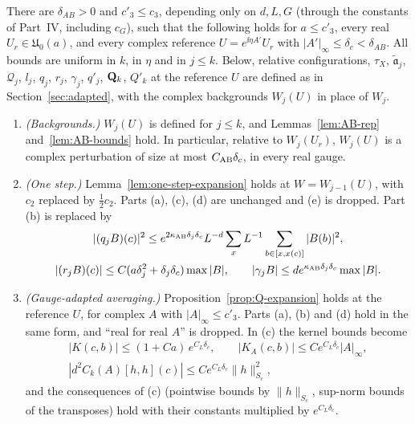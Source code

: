\begin{proposition}\label{prop:AB}
There are $\delta_{AB}>0$ and $c'_3\le c_3$, depending only on $d,L,G$ (through the constants of Part~IV, including $c_G$), such that the following holds for $a\le c'_3$, every real $U_r\in\mathfrak U_0(a)$, and every complex reference $U=e^{\ii\eta A'}U_r$ with $|A'|_\infty\le\delta_c<\delta_{AB}$. All bounds are uniform in $k$, in $\eta$ and in $j\le k$. Below, relative configurations, $\tau_X$, $\tilde{\mathfrak a}_j$, $\mathcal Q_j$, $l_j$, $q_j$, $r_j$, $\gamma_j$, $q'_j$, $\mathbf Q_k$, $Q'_k$ at the reference $U$ are defined as in Section~\ref{sec:adapted}, with the complex backgrounds $W_j(U)$ in place of $W_j$.
\begin{enumerate}[label=(\roman*)]
\item \emph{(Backgrounds.)} $W_j(U)$ is defined for $j\le k$, and Lemmas~\ref{lem:AB-rep} and~\ref{lem:AB-bounds} hold. In particular, relative to $W_j(U_r)$, $W_j(U)$ is a complex perturbation of size at most $C_{\rm AB}\delta_c$, in every real gauge.
\item \emph{(One step.)} Lemma~\ref{lem:one-step-expansion} holds at $W=W_{j-1}(U)$, with $c_2$ replaced by $\frac12c_2$. Parts (a), (c), (d) are unchanged and (e) is dropped. Part (b) is replaced by
\begin{gather*}
|(q_jB)(c)|^2\le e^{2\kappa_{\rm AB}\delta_j\delta_c}L^{-d}\sum_xL^{-1}\sum_{b\in[x,x(c)]}|B(b)|^2,\\
|(r_jB)(c)|\le C(a\delta_j^2+\delta_j\delta_c)\max|B|,\qquad|\gamma_jB|\le de^{\kappa_{\rm AB}\delta_j\delta_c}\max|B| .
\end{gather*}
\item \emph{(Gauge-adapted averaging.)} Proposition~\ref{prop:Q-expansion} holds at the reference $U$, for complex $A$ with $|A|_\infty\le c'_3$. Parts (a), (b) and (d) hold in the same form, and ``real for real $A$'' is dropped. In (c) the kernel bounds become
\begin{gather*}
|K(c,b)|\le(1+Ca)\,e^{C_L\delta_c},\qquad|K_A(c,b)|\le Ce^{C_L\delta_c}|A|_\infty,\\
|d^2C_k(A)[h,h](c)|\le Ce^{C_L\delta_c}\|h\|^2_{S_c},
\end{gather*}
and the consequences of (c) (pointwise bounds by $\|h\|_{S_c}$, sup-norm bounds of the transposes) hold with their constants multiplied by $e^{C_L\delta_c}$.

\end{enumerate}
\end{proposition}
